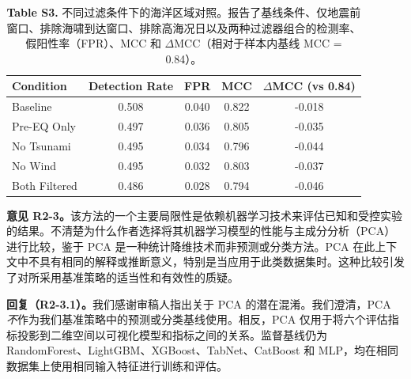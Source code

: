 \documentclass[12pt]{article}
\newcommand{\revcomment}[1]{\begingroup\color{commentcolor}#1\endgroup}
\newcommand{\revresponse}[1]{\begingroup\color{responsecolor}#1\endgroup}
\begin{document}
{\begin{table}[H]
\small
\centering
\caption*{\textbf{Table S3.} 不同过滤条件下的海洋区域对照。报告了基线条件、仅地震前窗口、排除海啸到达窗口、排除高海况日以及两种过滤器组合的检测率、假阳性率（FPR）、MCC 和 $\Delta$MCC（相对于样本内基线 MCC = 0.84）。}
\begin{tabular}{@{}lcccc@{}}
\toprule
Condition      & Detection Rate & FPR   & MCC   & $\Delta$MCC (vs 0.84) \\
\midrule
Baseline       & 0.508          & 0.040 & 0.822 & -0.018                \\
Pre-EQ Only    & 0.497          & 0.036 & 0.805 & -0.035                \\
No Tsunami     & 0.495          & 0.034 & 0.796 & -0.044                \\
No Wind        & 0.495          & 0.032 & 0.803 & -0.037                \\
Both Filtered  & 0.486          & 0.028 & 0.794 & -0.046                \\
\bottomrule
\end{tabular}
\end{table}
}

\bigskip

\bigskip

\revcomment{%
\textbf{意见 R2-3。}该方法的一个主要局限性是依赖机器学习技术来评估已知和受控实验的结果。不清楚为什么作者选择将其机器学习模型的性能与主成分分析（PCA）进行比较，鉴于 PCA 是一种统计降维技术而非预测或分类方法。PCA 在此上下文中不具有相同的解释或推断意义，特别是当应用于此类数据集时。这种比较引发了对所采用基准策略的适当性和有效性的质疑。
}

\revresponse{%
\textbf{回复（R2-3.1）。}我们感谢审稿人指出关于 PCA 的潜在混淆。我们澄清，PCA \emph{不}作为我们基准策略中的预测或分类基线使用。相反，PCA 仅用于将六个评估指标投影到二维空间以可视化模型和指标之间的关系。监督基线仍为 RandomForest、LightGBM、XGBoost、TabNet、CatBoost 和 MLP，均在相同数据集上使用相同输入特征进行训练和评估。
}
\end{document}
